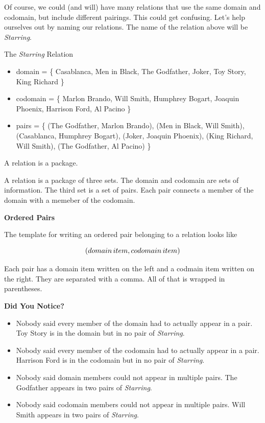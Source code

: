 \documentclass{ximera}
\begin{document}
Of course, we could (and will) have many relations that use the same domain and codomain, but include different pairings. This could get confusing.  Let's help ourselves out by naming our relations.  The name of the relation above will be \textit{Starring}.


\begin{example} The \textit{Starring} Relation


\begin{itemize}
\item domain = \{ Casablanca, Men in Black,  The Godfather, Joker, Toy Story, King Richard \}  
\item codomain = \{ Marlon Brando, Will Smith, Humphrey Bogart, Joaquin Phoenix, Harrison Ford, Al Pacino  \} 
\item pairs = \{ (The Godfather, Marlon Brando), (Men in Black, Will Smith), (Casablanca, Humphrey Bogart), (Joker, Joaquin Phoenix), (King Richard, Will Smith), (The Godfather, Al Pacino) \} 
\end{itemize}
\end{example}


A relation is a package.  

A relation is a package of three sets. The domain and codomain are sets of information.  The third set is a set of pairs.  Each pair connects a member of the domain with a memeber of the codomain. 


\begin{template} \textbf{\textcolor{purple!65!blue}{Ordered Pairs}}  

The template for writing an ordered pair belonging to a relation looks like  

\[ \large{( domain \, item, codomain \, item )} \]

Each pair has a domain item written on the left and a codmain item written on the right.  They are separated with a comma.  All of that is wrapped in parentheses.

\end{template}




\begin{warning} \textbf{\textcolor{red!70!black}{Did You Notice?}}  
\begin{itemize}
\item Nobody said every member of the domain had to actually appear in a pair.  Toy Story is in the domain but in no pair of \textit{Starring}.
\item Nobody said every member of the codomain had to actually appear in a pair.  Harrison Ford is in the codomain but in no pair of \textit{Starring}.
\item Nobody said domain members could not appear in multiple pairs.  The Godfather appears in two pairs of \textit{Starring}.
\item Nobody said codomain members could not appear in multiple pairs.  Will Smith appears in two pairs of \textit{Starring}.
\end{itemize}
\end{warning}
\end{document}
